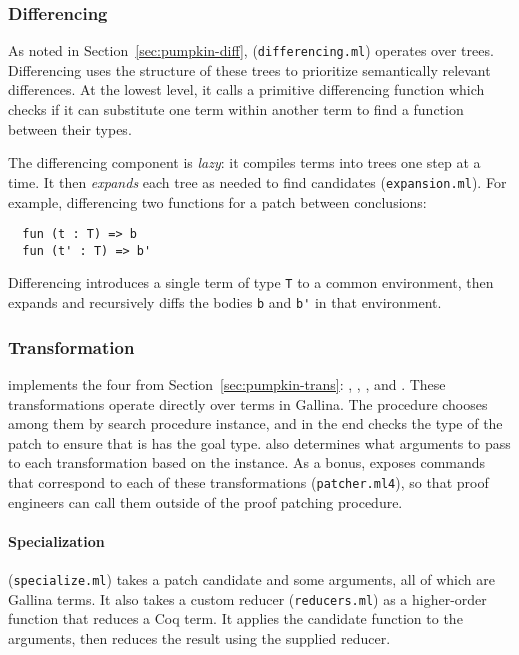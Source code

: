 \subsubsection{Differencing} 
\label{sec:pumpkin-impl-diff}

As noted in Section~\ref{sec:pumpkin-diff},  (\lstinline{differencing.ml}) operates over trees.
Differencing uses the structure of these trees to prioritize semantically relevant differences.
At the lowest level, it calls a primitive differencing function which checks if it can substitute one term within another term to find a function between their types.

The differencing component is \textit{lazy}: it compiles terms into trees one step at a time.
It then \emph{expands} each tree as needed to find candidates (\lstinline{expansion.ml}).
For example, differencing two functions for a patch between conclusions:

\begin{lstlisting}
  fun (t : T) => b
  fun (t' : T) => b'
\end{lstlisting}
Differencing introduces a single term of type \lstinline{T} to a common environment,
then expands and recursively diffs the bodies \lstinline{b} and \lstinline{b'} in that environment.

\subsubsection{Transformation}
\label{sec:pumpkin-impl-trans}

\sysname implements the four  from Section~\ref{sec:pumpkin-trans}:
, , , and .
These transformations operate directly over terms in Gallina.
The \sysname procedure chooses among them by search procedure instance,
and in the end checks the type of the patch to ensure that is has the goal type.
\sysname also determines what arguments to pass to each transformation based on the instance.
As a bonus, \sysname exposes commands that correspond to each of these transformations (\lstinline{patcher.ml4}),
so that proof engineers can call them outside of the proof patching procedure.

\paragraph{Specialization}  (\lstinline{specialize.ml}) takes a patch candidate and some arguments,
all of which are Gallina terms.
It also takes a custom reducer (\lstinline{reducers.ml}) %
as a higher-order function that reduces a Coq term.
It applies the candidate function to the arguments, then reduces the result using the supplied reducer.

